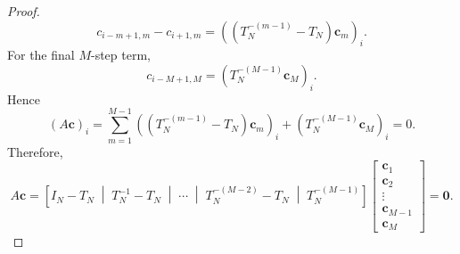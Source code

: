 \documentclass{article}
\newtheorem{lemma}[theorem]{Lemma}
\begin{document}
\begin{proof}
\[
c_{i-m+1,m}-c_{i+1,m}
=
\left(
(T_N^{-(m-1)}-T_N)\mathbf{c}_m
\right)_i.
\]
For the final $M$-step term,
\[
c_{i-M+1,M}
=
\left(
T_N^{-(M-1)}\mathbf{c}_M
\right)_i.
\]
Hence
\[
(A\mathbf{c})_i
=
\sum_{m=1}^{M-1}
\left(
(T_N^{-(m-1)}-T_N)\mathbf{c}_m
\right)_i
+
\left(
T_N^{-(M-1)}\mathbf{c}_M
\right)_i
=
0.
\]
Therefore,
\[
A\mathbf{c}
=
\left[
I_N-T_N
\;\middle|\;
T_N^{-1}-T_N
\;\middle|\;
\cdots
\;\middle|\;
T_N^{-(M-2)}-T_N
\;\middle|\;
T_N^{-(M-1)}
\right]
\begin{bmatrix}
\mathbf{c}_1\\
\mathbf{c}_2\\
\vdots\\
\mathbf{c}_{M-1}\\
\mathbf{c}_M
\end{bmatrix}
=
\mathbf{0}.
\]
\end{proof}










\end{document}
